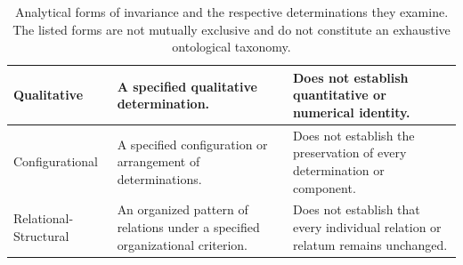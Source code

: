 \begin{table}[htbp]
\begin{tabular}{|p{3.0cm}|p{5.2cm}|p{5.2cm}|}
        Qualitative &
        A specified qualitative determination. &
        Does not establish quantitative or
        numerical identity.
        \\
        \hline

        Configurational &
        A specified configuration or arrangement
        of determinations. &
        Does not establish the preservation of
        every determination or component.
        \\
        \hline

        Relational-Structural &
        An organized pattern of relations under
        a specified organizational criterion. &
        Does not establish that every individual
        relation or relatum remains unchanged.
        \\
        \hline
    \end{tabular}

    \caption{Analytical forms of invariance and the respective
    determinations they examine. The listed forms are not
    mutually exclusive and do not constitute an exhaustive
    ontological taxonomy.}
    \label{tab:analytical-forms-of-invariance}
\end{table}

